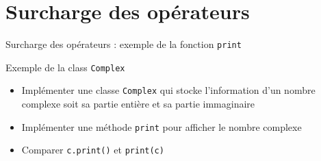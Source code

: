 \documentclass[10pt]{beamer}
\begin{document}









\section{Surcharge des opérateurs}

\begin{frame}[fragile]{Surcharge des opérateurs : exemple de la fonction \texttt{print}}

  \begin{block}{Exemple de la class \texttt{Complex}}
    \medskip
    \begin{itemize}
      \item Implémenter une classe \texttt{Complex} qui stocke l'information d'un nombre complexe soit sa partie entière et sa partie immaginaire
      \item Implémenter une méthode \texttt{print} pour afficher le nombre complexe
      \item Comparer \texttt{c.print()} et \texttt{print(c)}
    \end{itemize}
  \end{block}
\end{frame}
\end{document}
